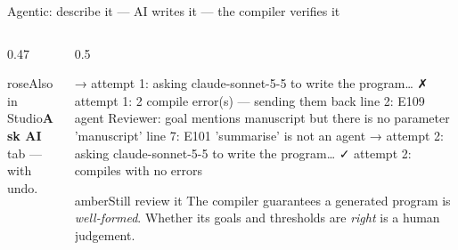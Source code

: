\documentclass[aspectratio=169,11pt]{beamer}
\begin{document}
\begin{frame}[fragile]{Agentic: describe it --- AI writes it --- the compiler verifies it}
\begin{columns}[T]
\begin{column}{0.47\textwidth}
\centering
{}
\vspace{1mm}
\begin{card}{rose}{Also in Studio}\textbf{Ask AI} tab --- with undo.\end{card}
\end{column}
\begin{column}{0.5\textwidth}
\begin{terminaltiny}
→ attempt 1: asking claude-sonnet-5-5 to write the program…
✗ attempt 1: 2 compile error(s) — sending them back
    line 2: E109 agent Reviewer: goal mentions {manuscript}
            but there is no parameter 'manuscript'
    line 7: E101 'summarise' is not an agent
→ attempt 2: asking claude-sonnet-5-5 to write the program…
✓ attempt 2: compiles with no errors
\end{terminaltiny}
\begin{card}{amber}{Still review it}
The compiler guarantees a generated program is \emph{well-formed}. Whether its goals and thresholds are \emph{right} is a human judgement.
\end{card}
\end{column}
\end{columns}
\end{frame}
\end{document}
